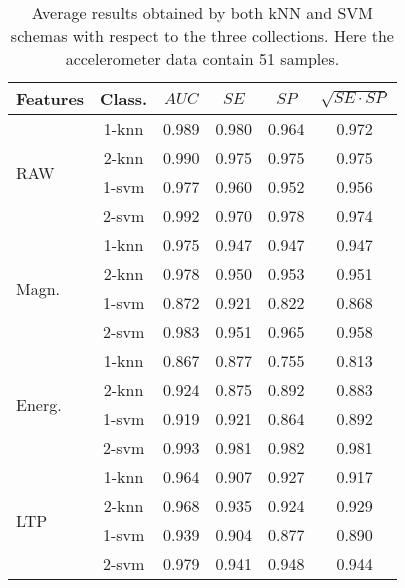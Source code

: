 \documentclass[twocolumn]{svjour3}          \smartqed  \usepackage[draft]{hyperref}
\begin{document}
   \begin{table}[tb]
\scriptsize
\centering
\begin{tabular}{lccccc}
	Features&Class.	&	$AUC$ &	$SE$ &	$SP$	&	$\sqrt{SE\cdot SP}$ \\
\hline \multirow{4}{*}{RAW}	&1-knn&	0.989&	0.980&	0.964&	0.972\\ 
&2-knn&	0.990&	0.975&	0.975&	0.975\\ 
&1-svm&	0.977&	0.960&	0.952&	0.956\\ 
&2-svm&	0.992&	0.970&	0.978&	0.974\\ 
[2pt] 
\hline 
\multirow{4}{*}{Magn.}	&1-knn&	0.975&	0.947&	0.947&	0.947\\ 
&2-knn&	0.978&	0.950&	0.953&	0.951\\ 
&1-svm&	0.872&	0.921&	0.822&	0.868\\ 
&2-svm&	0.983&	0.951&	0.965&	0.958\\ 
[2pt] 
\hline 
\multirow{4}{*}{Energ.}	&1-knn&	0.867&	0.877&	0.755&	0.813\\ 
&2-knn&	0.924&	0.875&	0.892&	0.883\\ 
&1-svm&	0.919&	0.921&	0.864&	0.892\\ 
&2-svm&	0.993&	0.981&	0.982&	0.981\\ 
[2pt] 
\hline 
\multirow{4}{*}{LTP}	&1-knn&	0.964&	0.907&	0.927&	0.917\\ 
&2-knn&	0.968&	0.935&	0.924&	0.929\\ 
&1-svm&	0.939&	0.904&	0.877&	0.890\\ 
&2-svm&	0.979&	0.941&	0.948&	0.944\\ 
[2pt] 
\hline 
\end{tabular}
\medskip
\caption{Average results obtained by both kNN and SVM schemas with respect to the three collections. Here the accelerometer data contain 51 samples.}
\label{table:summary-1-51}
 \end{table}
 
\end{document}
